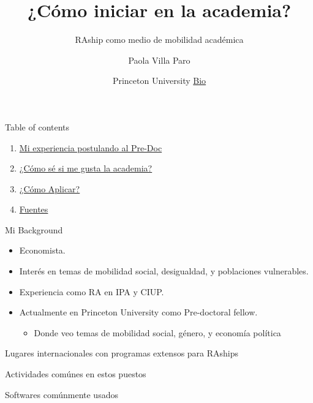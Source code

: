 \documentclass[
  ignorenonframetext,
]{beamer}
\title{¿Cómo iniciar en la academia?}
\subtitle{RAship como medio de mobilidad académica}
\author{Paola Villa Paro}
\date{Princeton University \textbar{} \href{https://pvillaparo.github.io}{Bio}}
\providecommand{\tightlist}{%
  \setlength{\itemsep}{0pt}\setlength{\parskip}{0pt}}
\begin{document}
\frame{\titlepage}

\begin{frame}{Table of contents}
\protect\hypertarget{table-of-contents}{}

\begin{enumerate}
\item
  \protect\hyperlink{experiencia}{Mi experiencia postulando al Pre-Doc}
\item
  \protect\hyperlink{comose}{¿Cómo sé si me gusta la academia?}
\item
  \protect\hyperlink{comoapp}{¿Cómo Aplicar?}
\item
  \protect\hyperlink{fuentes}{Fuentes}
\end{enumerate}

\end{frame}

\begin{frame}{Mi Background}
\protect\hypertarget{mi-background}{}

\begin{itemize}
\item
  Economista.
\item
  Interés en temas de mobilidad social, desigualdad, y poblaciones
  vulnerables.
\item
  Experiencia como RA en IPA y CIUP.
\item
  Actualmente en Princeton University como Pre-doctoral fellow.

  \begin{itemize}
  \tightlist
  \item
    Donde veo temas de mobilidad social, género, y economía política
  \end{itemize}
\end{itemize}

\end{frame}

\begin{frame}{Lugares internacionales con programas extensos para
RAships}
\protect\hypertarget{lugares-internacionales-con-programas-extensos-para-raships}{}

\end{frame}

\begin{frame}{Actividades comúnes en estos puestos}
\protect\hypertarget{actividades-comuxfanes-en-estos-puestos}{}

\end{frame}

\begin{frame}{Softwares comúnmente usados}
\protect\hypertarget{softwares-comuxfanmente-usados}{}

\end{frame}
\end{document}
